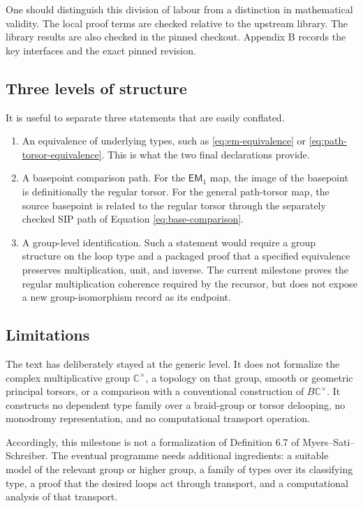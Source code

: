 One should distinguish this division of labour from a distinction in mathematical validity. The local proof terms are checked relative to the upstream library. The library results are also checked in the pinned checkout. Appendix B records the key interfaces and the exact pinned revision.

\subsection{Three levels of structure}
It is useful to separate three statements that are easily conflated.
\begin{enumerate}[label=\textbf{Level \arabic*:},leftmargin=2.3cm]
\item An equivalence of underlying types, such as \eqref{eq:em-equivalence} or \eqref{eq:path-torsor-equivalence}. This is what the two final declarations provide.
\item A basepoint comparison path. For the $\mathsf{EM}_1$ map, the image of the basepoint is definitionally the regular torsor. For the general path-torsor map, the source basepoint is related to the regular torsor through the separately checked SIP path of Equation \eqref{eq:base-comparison}.
\item A group-level identification. Such a statement would require a group structure on the loop type and a packaged proof that a specified equivalence preserves multiplication, unit, and inverse. The current milestone proves the regular multiplication coherence required by the recursor, but does not expose a new group-isomorphism record as its endpoint.
\end{enumerate}

\subsection{Limitations}
The text has deliberately stayed at the generic level. It does not formalize the complex multiplicative group $\mathbb{C}^{\times}$, a topology on that group, smooth or geometric principal torsors, or a comparison with a conventional construction of $B\mathbb{C}^{\times}$. It constructs no dependent type family over a braid-group or torsor delooping, no monodromy representation, and no computational transport operation.

Accordingly, this milestone is not a formalization of Definition 6.7 of Myers--Sati--Schreiber. The eventual programme needs additional ingredients: a suitable model of the relevant group or higher group, a family of types over its classifying type, a proof that the desired loops act through transport, and a computational analysis of that transport.

